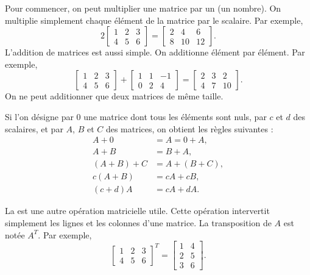Pour commencer, on peut multiplier une matrice par un \emph{} (un nombre).
On multiplie simplement chaque élément de la matrice par le scalaire. Par exemple,
\begin{equation*}
2
\begin{bmatrix}
1 & 2 & 3 \\
4 & 5 & 6
\end{bmatrix} =
\begin{bmatrix}
2 & 4 & 6 \\
8 & 10 & 12
\end{bmatrix} .
\end{equation*}
L'addition de matrices est aussi simple. On additionne élément par élément. Par exemple,
\begin{equation*}
\begin{bmatrix}
1 & 2 & 3 \\
4 & 5 & 6
\end{bmatrix} +
\begin{bmatrix}
1 & 1 & -1 \\
0 & 2 & 4
\end{bmatrix}
=
\begin{bmatrix}
2 & 3 & 2 \\
4 & 7 & 10
\end{bmatrix} .
\end{equation*}
On ne peut additionner que deux matrices de même taille.

Si l'on désigne par 0 une matrice dont tous les éléments sont nuls, par
$c$ et $d$ des scalaires, et par $A$, $B$ et $C$ des matrices, on obtient les règles suivantes :
\begin{align*}
A + 0 & = A = 0 + A , \\
A + B & = B + A , \\
(A + B) + C & = A + (B + C) , \\
c(A+B) & = cA+cB, \\
(c+d)A & = cA + dA.
\end{align*}

La \emph{} est une autre opération matricielle utile. Cette opération intervertit simplement les lignes et les colonnes d'une matrice. La transposition de $A$ est notée $A^T$. Par exemple,
\begin{equation*}
\begin{bmatrix}
1 & 2 & 3 \\
4 & 5 & 6
\end{bmatrix}^T =
\begin{bmatrix}
1 & 4 \\
2 & 5 \\
3 & 6 
\end{bmatrix}.
\end{equation*}


